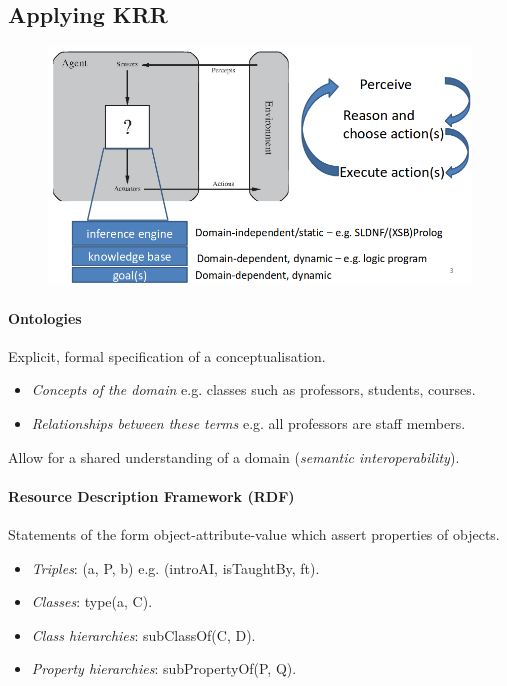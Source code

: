 \documentclass[twocolumn,english]{article}
\begin{document}
\subsection{Applying KRR}

\begin{figure}[H]
\centering{}\includegraphics[width=0.75\columnwidth]{img/krr-applications}
\end{figure}

\paragraph{Ontologies}

Explicit, formal specification of a conceptualisation.
\begin{itemize}
\item \emph{Concepts of the domain} e.g. classes such as professors, students,
courses.
\item \emph{Relationships between these terms} e.g. all professors are staff
members.
\end{itemize}
Allow for a shared understanding of a domain (\emph{semantic interoperability}).

\paragraph{Resource Description Framework (RDF)}

Statements of the form object-attribute-value which assert properties
of objects.
\begin{itemize}
\item \emph{Triples}: (a, P, b) e.g. (introAI, isTaughtBy, ft).
\item \emph{Classes}: type(a, C).
\item \emph{Class hierarchies}: subClassOf(C, D).
\item \emph{Property hierarchies}: subPropertyOf(P, Q).
\end{itemize}
\end{document}
